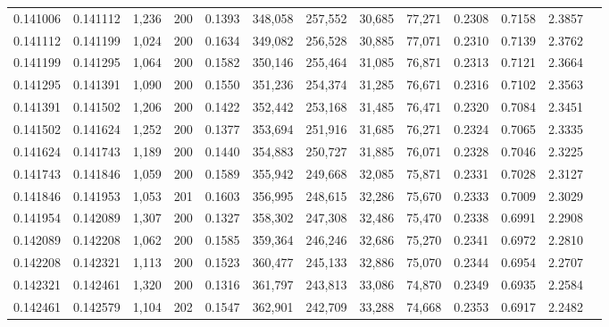 \begin{tabular}{rrrrrrrrrrrrr}
0.141006 & 0.141112 &  1,236 & 200 &                                     0.1393 & 348,058 & 257,552 &  30,685 &  77,271 & 0.2308 & 0.7158 & 2.3857 \\
0.141112 & 0.141199 &  1,024 & 200 &                                     0.1634 & 349,082 & 256,528 &  30,885 &  77,071 & 0.2310 & 0.7139 & 2.3762 \\
0.141199 & 0.141295 &  1,064 & 200 &                                     0.1582 & 350,146 & 255,464 &  31,085 &  76,871 & 0.2313 & 0.7121 & 2.3664 \\
0.141295 & 0.141391 &  1,090 & 200 &                                     0.1550 & 351,236 & 254,374 &  31,285 &  76,671 & 0.2316 & 0.7102 & 2.3563 \\
0.141391 & 0.141502 &  1,206 & 200 &                                     0.1422 & 352,442 & 253,168 &  31,485 &  76,471 & 0.2320 & 0.7084 & 2.3451 \\
0.141502 & 0.141624 &  1,252 & 200 &                                     0.1377 & 353,694 & 251,916 &  31,685 &  76,271 & 0.2324 & 0.7065 & 2.3335 \\
0.141624 & 0.141743 &  1,189 & 200 &                                     0.1440 & 354,883 & 250,727 &  31,885 &  76,071 & 0.2328 & 0.7046 & 2.3225 \\
0.141743 & 0.141846 &  1,059 & 200 &                                     0.1589 & 355,942 & 249,668 &  32,085 &  75,871 & 0.2331 & 0.7028 & 2.3127 \\
0.141846 & 0.141953 &  1,053 & 201 &                                     0.1603 & 356,995 & 248,615 &  32,286 &  75,670 & 0.2333 & 0.7009 & 2.3029 \\
0.141954 & 0.142089 &  1,307 & 200 &                                     0.1327 & 358,302 & 247,308 &  32,486 &  75,470 & 0.2338 & 0.6991 & 2.2908 \\
0.142089 & 0.142208 &  1,062 & 200 &                                     0.1585 & 359,364 & 246,246 &  32,686 &  75,270 & 0.2341 & 0.6972 & 2.2810 \\
0.142208 & 0.142321 &  1,113 & 200 &                                     0.1523 & 360,477 & 245,133 &  32,886 &  75,070 & 0.2344 & 0.6954 & 2.2707 \\
0.142321 & 0.142461 &  1,320 & 200 &                                     0.1316 & 361,797 & 243,813 &  33,086 &  74,870 & 0.2349 & 0.6935 & 2.2584 \\
0.142461 & 0.142579 &  1,104 & 202 &                                     0.1547 & 362,901 & 242,709 &  33,288 &  74,668 & 0.2353 & 0.6917 & 2.2482 \\

\end{tabular}
